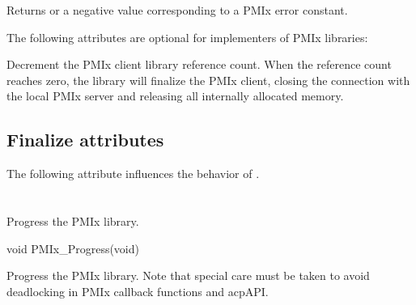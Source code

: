 Returns  or a negative value corresponding to a PMIx error constant.

\optattrstart
The following attributes are optional for implementers of \ac{PMIx} libraries:

\optattrend

\descr

Decrement the \ac{PMIx} client library reference count.
When the reference count reaches zero, the library will finalize the \ac{PMIx} client, closing the connection with the local \ac{PMIx} server and releasing all internally allocated memory.

\subsection{Finalize attributes}

The following attribute influences the behavior of .

%


\section{}

\summary

Progress the \ac{PMIx} library.

\format

\cspecificstart
\begin{codepar}
void
PMIx_Progress(void)
\end{codepar}
\cspecificend


\descr

Progress the \ac{PMIx} library. Note that special care must be taken to avoid deadlocking in \ac{PMIx} callback functions and acp{API}.

